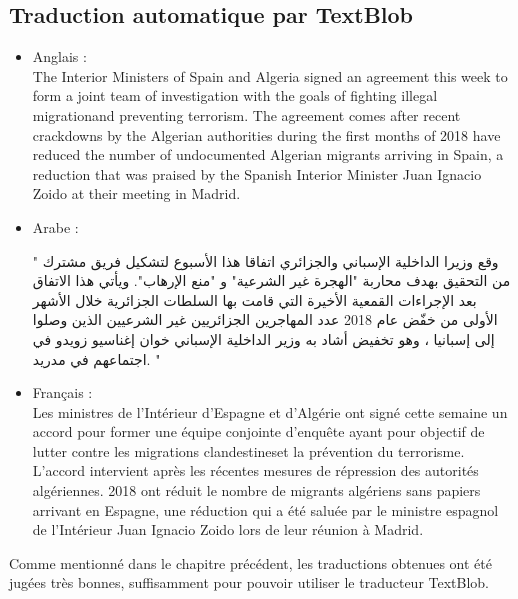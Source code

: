 \subsection{Traduction automatique par TextBlob}
\begin{itemize}
    \item Anglais :\\ 
    \textquotedbl The Interior Ministers of Spain and Algeria signed an agreement this week to form a joint team of investigation with the goals of fighting \textquotedbl illegal migration\textquotedbl and \textquotedbl preventing terrorism\textquotedbl. The agreement comes after recent crackdowns by the Algerian authorities during the first months of 2018 have reduced the number of undocumented Algerian migrants arriving in Spain, a reduction that was praised by the Spanish Interior Minister Juan Ignacio Zoido at their meeting in Madrid.\textquotedbl \\
    
    \item Arabe :
    \begin{arab}" وقع وزيرا الداخلية الإسباني والجزائري اتفاقا هذا الأسبوع لتشكيل فريق مشترك من التحقيق بهدف محاربة "الهجرة غير الشرعية" و "منع الإرهاب". ويأتي هذا الاتفاق بعد الإجراءات القمعية الأخيرة التي قامت بها السلطات الجزائرية خلال الأشهر الأولى من خفّض عام 2018 عدد المهاجرين الجزائريين غير الشرعيين الذين وصلوا إلى إسبانيا ، وهو تخفيض أشاد به وزير الداخلية الإسباني خوان إغناسيو زويدو في اجتماعهم في مدريد. "\end{arab}
    
    \item Français :\\
    \textquotedbl Les ministres de l'Intérieur d'Espagne et d'Algérie ont signé cette semaine un accord pour former une équipe conjointe d'enquête ayant pour objectif de lutter contre les \textquotedbl migrations clandestines\textquotedbl et \textquotedbl la prévention du terrorisme\textquotedbl. L'accord intervient après les récentes mesures de répression des autorités algériennes. 2018 ont réduit le nombre de migrants algériens sans papiers arrivant en Espagne, une réduction qui a été saluée par le ministre espagnol de l'Intérieur Juan Ignacio Zoido lors de leur réunion à Madrid.\textquotedbl\\
\end{itemize}

Comme mentionné dans le chapitre précédent, les traductions obtenues ont été jugées très bonnes, suffisamment pour pouvoir utiliser le traducteur TextBlob.

